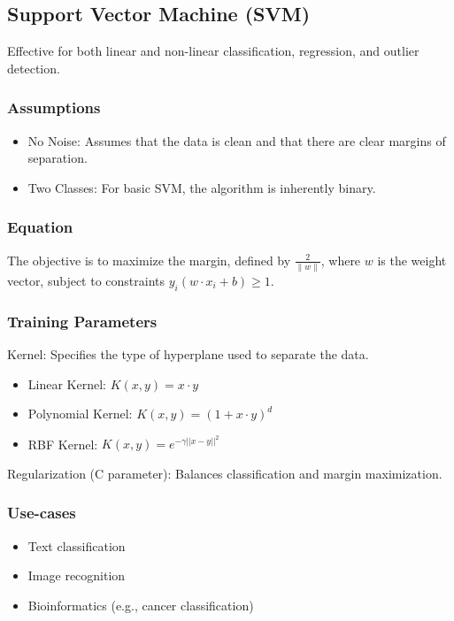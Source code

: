 \documentclass[english, threecolumn]{latex4ei/latex4ei_sheet}
\begin{document}
\begin{sectionbox}
\subsection{Support Vector Machine (SVM)}

Effective for both linear and non-linear classification, regression, and outlier detection.

\subsubsection{Assumptions}
\begin{itemize}
    \item No Noise: Assumes that the data is clean and that there are clear margins of separation.
    \item Two Classes: For basic SVM, the algorithm is inherently binary.
\end{itemize}

\subsubsection{Equation}
The objective is to maximize the margin, defined by \( \frac{2}{\|w\|} \), where \(w\) is the weight vector, subject to constraints \( y_i(w \cdot x_i + b) \geq 1 \).

\subsubsection{Training Parameters}
Kernel: Specifies the type of hyperplane used to separate the data.
\begin{itemize}
    \item Linear Kernel: \(K(x, y) = x \cdot y\)
    \item Polynomial Kernel: \(K(x, y) = (1 + x \cdot y)^d\)
    \item RBF Kernel: \(K(x, y) = e^{-\gamma ||x-y||^2}\)
\end{itemize}
Regularization (C parameter): Balances classification and margin maximization. 

\subsubsection{Use-cases}
\begin{itemize}
    \item Text classification
    \item Image recognition
    \item Bioinformatics (e.g., cancer classification)
\end{itemize}


\end{sectionbox}
\end{document}
